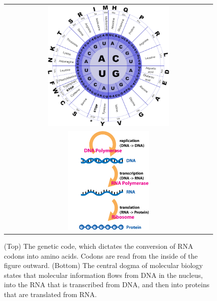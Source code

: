 \begin{figure}[hp]
\centering
\mySfFamily
\begin{tabular}{c}
\includegraphics[width = 0.6\textwidth]{../images/genetic_code.png}\\[3ex]
\includegraphics[width = 0.4\textwidth]{../images/Central_Dogma_of_Molecular_Biochemistry_with_Enzymes.jpg}
\end{tabular}
\caption{(Top) The genetic code, which dictates the conversion of RNA codons into amino acids. Codons are read from the inside of the figure outward. (Bottom) The central dogma of molecular biology states that molecular information flows from DNA in the nucleus, into the RNA that is transcribed from DNA, and then into proteins that are translated from RNA.}
\label{fig:central_dogma}
\end{figure}


